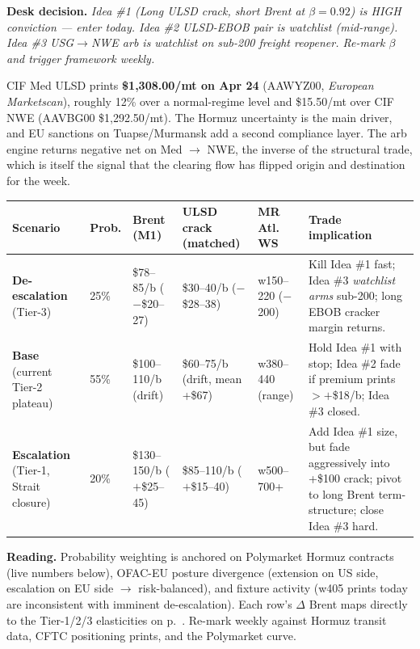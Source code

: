 \documentclass[10pt,a4paper]{article}
\begin{document}
\noindent\textcolor{obred}{\textbf{Desk decision.}} \emph{Idea \#1 (Long ULSD crack, short Brent at $\beta=0.92$) is HIGH conviction --- enter today. Idea \#2 ULSD-EBOB pair is watchlist (mid-range). Idea \#3 USG$\rightarrow$NWE arb is watchlist on sub-200 freight reopener. Re-mark $\beta$ and trigger framework weekly.}

\vspace{0.2cm}

\noindent CIF Med ULSD prints \textbf{\$1,308.00/mt on Apr 24} (AAWYZ00, \emph{European Marketscan}), roughly 12\% over a normal-regime level and \$15.50/mt over CIF \mbox{NWE} (AAVBG00 \$1,292.50/mt). The Hormuz uncertainty is the main driver, and EU sanctions on Tuapse/Murmansk add a second compliance layer. The arb engine returns negative net on Med $\rightarrow$ \mbox{NWE}, the inverse of the structural trade, which is itself the signal that the clearing flow has flipped origin and destination for the week.

\vspace{0.2cm}

\begin{callout}
\footnotesize
\setlength{\tabcolsep}{4pt}
\renewcommand{\arraystretch}{1.2}
\begin{tabular}{@{}p{}p{}p{}p{}p{}p{}@{}}
\toprule
\textbf{Scenario} & \textbf{Prob.} & \textbf{Brent (M1)} & \textbf{ULSD crack (matched)} & \textbf{MR Atl. WS} & \textbf{Trade implication} \\
\midrule
\textbf{De-escalation} (Tier-3) & 25\% & \$78--85/b ($-$\$20--27) & \$30--40/b ($-$\$28--38) & w150--220 ($-$200) & Kill Idea \#1 fast; Idea \#3 \emph{watchlist arms} sub-200; long EBOB cracker margin returns. \\
\textbf{Base} (current Tier-2 plateau) & 55\% & \$100--110/b (drift) & \$60--75/b (drift, mean +\$67) & w380--440 (range) & Hold Idea \#1 with stop; Idea \#2 fade if premium prints $>+$\$18/b; Idea \#3 closed. \\
\textbf{Escalation} (Tier-1, Strait closure) & 20\% & \$130--150/b ($+$\$25--45) & \$85--110/b ($+$\$15--40) & w500--700+ & Add Idea \#1 size, but fade aggressively into +\$100 crack; pivot to long Brent term-structure; close Idea \#3 hard. \\
\bottomrule
\end{tabular}
\smallskip

\textbf{Reading.} Probability weighting is anchored on Polymarket Hormuz contracts (live numbers below), OFAC-EU posture divergence (extension on US side, escalation on EU side $\rightarrow$ risk-balanced), and fixture activity (w405 prints today are inconsistent with imminent de-escalation). Each row's $\Delta$ Brent maps directly to the Tier-1/2/3 elasticities on p.~\pageref{sec:2}. Re-mark weekly against Hormuz transit data, CFTC positioning prints, and the Polymarket curve.
\end{callout}
\end{document}
